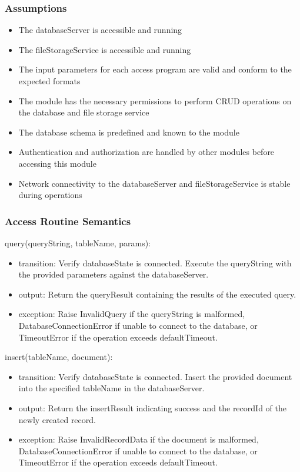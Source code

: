 \documentclass[12pt, titlepage]{article}
\begin{document}
\subsubsection{Assumptions}

\begin{itemize}
  \item The databaseServer is accessible and running
  \item The fileStorageService is accessible and running
  \item The input parameters for each access program are valid and conform to the expected formats
  \item The module has the necessary permissions to perform CRUD operations on the database and file storage service
  \item The database schema is predefined and known to the module
  \item Authentication and authorization are handled by other modules before accessing this module
  \item Network connectivity to the databaseServer and fileStorageService is stable during operations
\end{itemize}

\subsubsection{Access Routine Semantics}

\noindent query(queryString, tableName, params):
\begin{itemize}
  \item transition: Verify databaseState is connected. Execute the queryString with the provided parameters against the databaseServer.
  \item output: Return the queryResult containing the results of the executed query.
  \item exception: Raise InvalidQuery if the queryString is malformed, DatabaseConnectionError if unable to connect to the database, or TimeoutError if the operation exceeds defaultTimeout.
\end{itemize}

\noindent insert(tableName, document):
\begin{itemize}
  \item transition: Verify databaseState is connected. Insert the provided document into the specified tableName in the databaseServer.
  \item output: Return the insertResult indicating success and the recordId of the newly created record.
  \item exception: Raise InvalidRecordData if the document is malformed, DatabaseConnectionError if unable to connect to the database, or TimeoutError if the operation exceeds defaultTimeout.  
\end{itemize}
\end{document}
